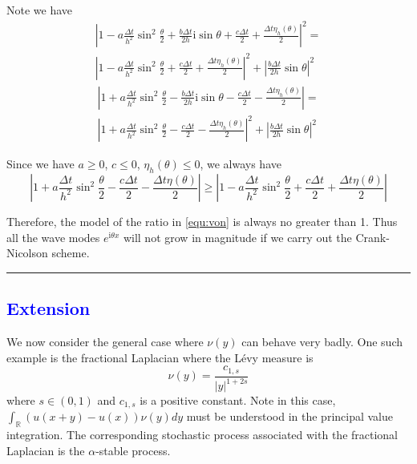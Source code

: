 \documentclass[10pt,a4paper]{article}
\newcommand{\ii}[0]{\mathrm{i}}
\newcommand{\RR}[0]{\mathbb{R}}
\newcommand{\lib}[1]{\textcolor{blue}{\section{#1}}}
\theoremstyle{definition}
\begin{document}
Note we have
\begin{multline}
{\left| {1 - a\frac{{\Delta t}}{{{h^2}}}{{\sin }^2}\frac{\theta }{2} + \frac{{b\Delta t}}{{2h}}\ii\sin \theta  + \frac{{c\Delta t}}{2} + \frac{{\Delta t\eta_h (\theta )}}{2}} \right|^2} = \\
{\left| {1 - a\frac{{\Delta t}}{{{h^2}}}{{\sin }^2}\frac{\theta }{2} + \frac{{c\Delta t}}{2} + \frac{{\Delta t\eta_h (\theta )}}{2}} \right|^2} + {\left| {\frac{{b\Delta t}}{{2h}}\sin \theta } \right|^2}
\end{multline}
\begin{multline}
\left| {1 + a\frac{{\Delta t}}{{{h^2}}}{{\sin }^2}\frac{\theta }{2} - \frac{{b\Delta t}}{{2h}}\ii\sin \theta  - \frac{{c\Delta t}}{2} - \frac{{\Delta t\eta_h (\theta )}}{2}} \right| = \\
{\left| {1 + a\frac{{\Delta t}}{{{h^2}}}{{\sin }^2}\frac{\theta }{2} - \frac{{c\Delta t}}{2} - \frac{{\Delta t\eta_h (\theta )}}{2}} \right|^2} + {\left| {\frac{{b\Delta t}}{{2h}}\sin \theta } \right|^2}
\end{multline}

Since we have $a\geq 0$, $c\leq 0$, $\eta_h(\theta)\leq  0$, we always have
\begin{equation}
	\left| {1 + a\frac{{\Delta t}}{{{h^2}}}{{\sin }^2}\frac{\theta }{2} - \frac{{c\Delta t}}{2} - \frac{{\Delta t\eta (\theta )}}{2}} \right| \ge \left| {1 - a\frac{{\Delta t}}{{{h^2}}}{{\sin }^2}\frac{\theta }{2} + \frac{{c\Delta t}}{2} + \frac{{\Delta t\eta (\theta )}}{2}} \right|
\end{equation}

Therefore, the model of the ratio in \cref{equ:von} is always no greater than 1. Thus all the wave modes $e^{\ii \theta x}$ will not grow in magnitude if we carry out the Crank-Nicolson scheme. 

\hrule






\lib{Extension}

We now consider the general case where $\nu(y)$ can behave very badly. One such example is the fractional Laplacian where the L\'evy measure is 
\begin{equation}
	\nu(y) = \frac{c_{1,s}}{|y|^{1+2s}}
\end{equation}
where $s\in (0,1)$ and $c_{1,s}$ is a positive constant. Note in this case, $\int_{\RR}(u(x+y)-u(x))\nu(y)dy$ must be understood in the principal value integration. The corresponding stochastic process associated with the fractional Laplacian is the $\alpha$-stable process. 
\end{document}
